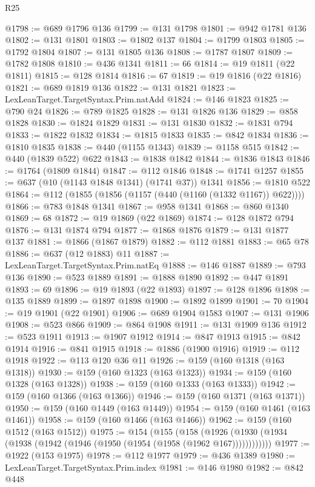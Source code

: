 \begin{lexlean}{R25}
\begin{coremodule}
{{{{{{{{{{{{{{{{{{{{{{{{{{{{{{{{{{{{{{{{{{{{{{{{{{{{{{{{{{{{{{{{{{{{{{{{{{{{{{{{{{{{{{{{{{{{{{{{{{{{{{{{{{{{{{{{{{{{{{{{{{{{{{{{{{{{{{{{{{{{{{{{{{{{{{{{{{{{{{{{{{{{{{{{{{{{{{{{{{{{{{{{{{{{{{{{{{{{{{{@1798 := @689 @1796 @136
@1799 := @131 @1798
@1801 := @942 @1781 @136
@1802 := @131 @1801
@1803 := @1802 @137
@1804 := @1799 @1803
@1805 := @1792 @1804
@1807 := @131 @1805 @136
@1808 := @1787 @1807
@1809 := @1782 @1808
@1810 := @436 @1341
@1811 := 66
@1814 := @19 @1811 (@22 @1811)
@1815 := @128 @1814
@1816 := 67
@1819 := @19 @1816 (@22 @1816)
@1821 := @689 @1819 @136
@1822 := @131 @1821
@1823 := LexLeanTarget.TargetSyntax.Prim.natAdd
@1824 := @146 @1823
@1825 := @790 @24
@1826 := @789 @1825
@1828 := @131 @1826 @136
@1829 := @858 @1828
@1830 := @1824 @1829
@1831 := @131 @1830
@1832 := @1831 @794
@1833 := @1822 @1832
@1834 := @1815 @1833
@1835 := @842 @1834
@1836 := @1810 @1835
@1838 := @440 (@1155 @1343)
@1839 := @1158 @515
@1842 := @440 (@1839 @522) @622
@1843 := @1838 @1842
@1844 := @1836 @1843
@1846 := @1764 (@1809 @1844)
@1847 := @112 @1846
@1848 := @1741 @1257
@1855 := @637 (@10 (@1143 @1848 @1341) (@1741 @37)) @1341
@1856 := @1810 @522
@1864 := @112 (@1855 (@1856 (@1157 (@440 (@1160 (@1332 @1167)) @622))))
@1866 := @783 @1848 @1341
@1867 := @958 @1341
@1868 := @860 @1340
@1869 := 68
@1872 := @19 @1869 (@22 @1869)
@1874 := @128 @1872 @794
@1876 := @131 @1874 @794
@1877 := @1868 @1876
@1879 := @131 @1877 @137
@1881 := @1866 (@1867 @1879)
@1882 := @112 @1881
@1883 := @65 @78
@1886 := @637 (@12 @1883) @11
@1887 := LexLeanTarget.TargetSyntax.Prim.natEq
@1888 := @146 @1887
@1889 := @793 @136
@1890 := @523 @1889
@1891 := @1888 @1890
@1892 := @447 @1891
@1893 := 69
@1896 := @19 @1893 (@22 @1893)
@1897 := @128 @1896
@1898 := @135 @1889
@1899 := @1897 @1898
@1900 := @1892 @1899
@1901 := 70
@1904 := @19 @1901 (@22 @1901)
@1906 := @689 @1904 @1583
@1907 := @131 @1906
@1908 := @523 @866
@1909 := @864 @1908
@1911 := @131 @1909 @136
@1912 := @523 @1911
@1913 := @1907 @1912
@1914 := @847 @1913
@1915 := @842 @1914
@1916 := @841 @1915
@1918 := @1886 (@1900 @1916)
@1919 := @112 @1918
@1922 := @113 @120 @36 @11
@1926 := @159 (@160 @1318 (@163 @1318))
@1930 := @159 (@160 @1323 (@163 @1323))
@1934 := @159 (@160 @1328 (@163 @1328))
@1938 := @159 (@160 @1333 (@163 @1333))
@1942 := @159 (@160 @1366 (@163 @1366))
@1946 := @159 (@160 @1371 (@163 @1371))
@1950 := @159 (@160 @1449 (@163 @1449))
@1954 := @159 (@160 @1461 (@163 @1461))
@1958 := @159 (@160 @1466 (@163 @1466))
@1962 := @159 (@160 @1512 (@163 @1512))
@1975 := @154
    (@155
      (@158 (@1926 (@1930 (@1934 (@1938 (@1942 (@1946 (@1950 (@1954 (@1958 (@1962 @167))))))))))))
@1977 := @1922 (@153 @1975)
@1978 := @112 @1977
@1979 := @436 @1389
@1980 := LexLeanTarget.TargetSyntax.Prim.index
@1981 := @146 @1980
@1982 := @842 @448
}}}}}}}}}}}}}}}}}}}}}}}}}}}}}}}}}}}}}}}}}}}}}}}}}}}}}}}}}}}}}}}}}}}}}}}}}}}}}}}}}}}}}}}}}}}}}}}}}}}}}}}}}}}}}}}}}}}}}}}}}}}}}}}}}}}}}}}}}}}}}}}}}}}}}}}}}}}}}}}}}}}}}}}}}}}}}}}}}}}}}}}}}}}}}}}}}}}}}}}
\end{coremodule}
\end{lexlean}
